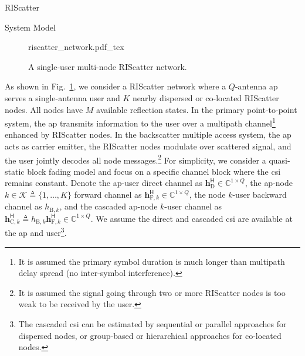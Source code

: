\documentclass[journal]{IEEEtran}
\begin{document}
\begin{section}{RIScatter}
	\begin{subsection}{System Model}
		\label{se:system_model}
		\begin{figure}[!t]
			\centering
			\def\svgwidth{0.7\columnwidth}
			\footnotesize{
				{riscatter_network.pdf_tex}
			}
			\caption{A single-user multi-node RIScatter network.}
			\label{fg:riscatter_network}
		\end{figure}
		As shown in Fig.~\ref{fg:riscatter_network}, we consider a RIScatter network where a $Q$-antenna \gls{ap} serves a single-antenna user and $K$ nearby dispersed or co-located RIScatter nodes.
		All nodes have $M$ available reflection states.
		In the primary point-to-point system, the \gls{ap} transmits information to the user over a multipath channel\footnote{It is assumed the primary symbol duration is much longer than multipath delay spread (no inter-symbol interference).} enhanced by RIScatter nodes.
		In the backscatter multiple access system, the \gls{ap} acts as carrier emitter, the RIScatter nodes modulate over scattered signal, and the user jointly decodes all node messages.\footnote{It is assumed the signal going through two or more RIScatter nodes is too weak to be received by the user.}
		For simplicity, we consider a quasi-static block fading model and focus on a specific channel block where the \gls{csi} remains constant.
		Denote the \gls{ap}-user direct channel as $\boldsymbol{h}_{\text{D}}^\mathsf{H} \in \mathbb{C}^{1 \times Q}$, the \gls{ap}-node $k \in \mathcal{K} \triangleq \{1,\ldots,K\}$ forward channel as $\boldsymbol{h}_{\text{F},k}^\mathsf{H} \in \mathbb{C}^{1 \times Q}$, the node $k$-user backward channel as $h_{\text{B},k}$, and the cascaded \gls{ap}-node $k$-user channel as $\boldsymbol{h}_{\text{C},k}^\mathsf{H} \triangleq h_{\text{B},k} \boldsymbol{h}_{\text{F},k}^\mathsf{H} \in \mathbb{C}^{1 \times Q}$.
		We assume the direct and cascaded \gls{csi} are available at the \gls{ap} and user\footnote{The cascaded \gls{csi} can be estimated by sequential \cite{Bharadia2015,Yang2015b,Guo2019g} or parallel \cite{Jin2021a} approaches for dispersed nodes, or group-based \cite{Zheng2019} or hierarchical \cite{You2019} approaches for co-located nodes.}.


\end{subsection}
\end{section}
\end{document}
